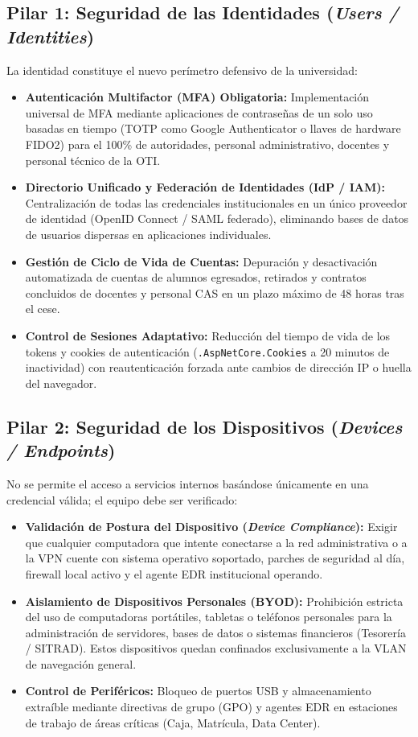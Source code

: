 \subsection*{Pilar 1: Seguridad de las Identidades (\textit{Users / Identities})}
La identidad constituye el nuevo perímetro defensivo de la universidad:
\begin{itemize}
    \item \textbf{Autenticación Multifactor (MFA) Obligatoria:} Implementación universal de MFA mediante aplicaciones de contraseñas de un solo uso basadas en tiempo (TOTP como Google Authenticator o llaves de hardware FIDO2) para el 100\% de autoridades, personal administrativo, docentes y personal técnico de la OTI.
    \item \textbf{Directorio Unificado y Federación de Identidades (IdP / IAM):} Centralización de todas las credenciales institucionales en un único proveedor de identidad (OpenID Connect / SAML federado), eliminando bases de datos de usuarios dispersas en aplicaciones individuales.
    \item \textbf{Gestión de Ciclo de Vida de Cuentas:} Depuración y desactivación automatizada de cuentas de alumnos egresados, retirados y contratos concluidos de docentes y personal CAS en un plazo máximo de 48 horas tras el cese.
    \item \textbf{Control de Sesiones Adaptativo:} Reducción del tiempo de vida de los tokens y cookies de autenticación (\texttt{.AspNetCore.Cookies} a 20 minutos de inactividad) con reautenticación forzada ante cambios de dirección IP o huella del navegador.
\end{itemize}

\subsection*{Pilar 2: Seguridad de los Dispositivos (\textit{Devices / Endpoints})}
No se permite el acceso a servicios internos basándose únicamente en una credencial válida; el equipo debe ser verificado:
\begin{itemize}
    \item \textbf{Validación de Postura del Dispositivo (\textit{Device Compliance}):} Exigir que cualquier computadora que intente conectarse a la red administrativa o a la VPN cuente con sistema operativo soportado, parches de seguridad al día, firewall local activo y el agente EDR institucional operando.
    \item \textbf{Aislamiento de Dispositivos Personales (BYOD):} Prohibición estricta del uso de computadoras portátiles, tabletas o teléfonos personales para la administración de servidores, bases de datos o sistemas financieros (Tesorería / SITRAD). Estos dispositivos quedan confinados exclusivamente a la VLAN de navegación general.
    \item \textbf{Control de Periféricos:} Bloqueo de puertos USB y almacenamiento extraíble mediante directivas de grupo (GPO) y agentes EDR en estaciones de trabajo de áreas críticas (Caja, Matrícula, Data Center).
\end{itemize}

